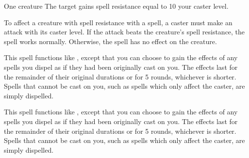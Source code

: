 \begin{spellheader}
    \spellrng{\rngclose}
    \spelldur{\durshort}
\end{spellheader}
\begin{spelleffects}
    \begin{spelltarget}{One creature}
        \spelleffect The target gains spell resistance equal to 10 \add your caster level.
    \end{spelltarget}
\end{spelleffects}
\begin{spellfooter}
    \spellnotes To affect a creature with spell resistance with a spell, a caster must make an attack with its caster level. If the attack beats the creature's spell resistance, the spell works normally. Otherwise, the spell has no effect on the creature.
\end{spellfooter}

\begin{spellheader}
\end{spellheader}
\begin{spelleffects}
    \spellspecial This spell functions like , except that you can choose to gain the effects of any spells you dispel as if they had been originally cast on you. The effects last for the remainder of their original durations or for 5 rounds, whichever is shorter. Spells that cannot be cast on you, such as spells which only affect the caster, are simply dispelled.
\end{spelleffects}
\begin{spellfooter}
    
\end{spellfooter}

\begin{spellheader}
\end{spellheader}
\begin{spelleffects}
    \spellspecial This spell functions like , except that you can choose to gain the effects of any spells you dispel as if they had been originally cast on you. The effects last for the remainder of their original durations or for 5 rounds, whichever is shorter. Spells that cannot be cast on you, such as spells which only affect the caster, are simply dispelled.
\end{spelleffects}
\begin{spellfooter}
    
\end{spellfooter}

